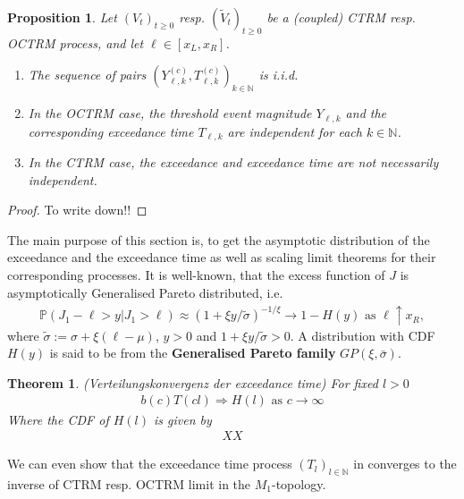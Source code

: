\documentclass[12pt]{article}
\newtheorem{theorem}[equation]{Theorem}
\newtheorem{proposition}[equation]{Proposition}
\newcommand{\N}{\mathbb{N}}
\newcommand{\PP}{\mathbb{P}}
\newcommand{\1}{\mathbf 1}
\begin{document}
\begin{proposition}\label{lem:independence}
Let $(V_t)_{t \geq 0}$ resp. $(\tilde{V}_t)_{t \geq 0}$ be a (coupled) CTRM resp. OCTRM process, and let $\ell \in [x_L,x_R]$.
\begin{enumerate}
\item[(i)]
The sequence of pairs $(Y^{(c)}_{\ell, k}, T^{(c)}_{\ell, k})_{k \in \mathbb N}$ 
is i.i.d.
\item[(ii)]
In the OCTRM case, the threshold event magnitude $Y_{\ell, k}$ and the 
corresponding exceedance time $T_{\ell, k}$ are independent for each $k \in \mathbb N$. 
\item[(iii)]
In the CTRM case, the exceedance and exceedance time are not necessarily independent. 
\end{enumerate}
\end{proposition}\begin{proof}
To write down!!
\end{proof}
The main purpose of this section is, to get the asymptotic distribution of the exceedance and the exceedance time as well as scaling limit theorems for their corresponding processes. It is well-known, that the excess function of $J$ is asymptotically Generalised Pareto distributed, i.e.
\begin{align*}
\PP(J_1 - \ell > y | J_1 > \ell) 
\approx (1+ \xi y / \tilde \sigma)^{-1/\xi} \rightarrow 1 - H(y) \text{ as } \ell \uparrow x_R,
\end{align*}
where $\tilde \sigma :=\sigma + \xi(\ell-\mu)$, $y>0$ and $1+\xi y/\tilde \sigma >0$. A distribution with CDF $H(y)$ is said to be from the \textbf{Generalised Pareto family}
$GP(\xi,\bar \sigma)$.\\  

\begin{theorem}(Verteilungskonvergenz der exceedance time)
For fixed $l>0$
\begin{align}
b(c) T(cl) \Rightarrow H(l) \text{ as } c \rightarrow \infty
\end{align} 
Where the CDF of $H(l)$ is given by
\begin{align*}
XX
\end{align*}
\end{theorem}

We can even show that the exceedance time process $(T_l)_{l \in \N}$ in converges to the inverse of CTRM resp. OCTRM limit in the $M_1$-topology.
\end{document}
